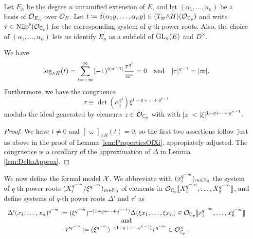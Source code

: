 \documentclass[../main.tex]{subfiles}
\begin{document}
Let $E_n$ be the degree $n$ unramified extension of $E$, and let 
$(\alpha_1, \dots, \alpha_n)$ be a basis of $\mathcal{O}_{E_n}$ over $\mathcal{O}_E$. 
Let $t \coloneq \delta(\alpha_1 y, \dots, \alpha_n y) \in (T_\varpi {\wedge H})(\mathcal{O}_{\mathbb{C}_p})$
and write $\tau \in {\mathrm{Nilp}}^\flat(\mathcal{O}_{\mathbb{C}_p})$ for the corresponding system of $q$-th 
power roots. Also, the choice of $(\alpha_1, \dots, \alpha_n)$ lets us 
identify $E_n$ as a subfield of $\operatorname{GL}_n(E)$ and $D^\times$. 

\begin{lem}\label{lem:PropertiesOfTau}
  We have 
  \begin{equation*}
    \log_{\wedge H}(t) = \sum_{i = -\infty}^\infty (-1)^{i(n-1)} \frac{\tau^{q^i}}{\varpi^i} = 0
    \quad \text{and} \quad
    \lvert \tau \rvert^{q-1} = \lvert \varpi \rvert.
  \end{equation*}
  Furthermore, we have the congruence
  \begin{equation*}
    \tau \equiv \det(\alpha_i^{q^j}) \xi^{1 + q + \dots + q^{n-1}}
  \end{equation*}
  modulo the ideal generated by elements $z \in \mathcal{O}_{\mathbb{C}_p}$ with with 
  $\lvert z \rvert < \lvert \xi \rvert^{1 + q + \dots + q^{n-1}}$. 
\begin{proof}
  We have $t \neq 0$ and $[\varpi]_{\wedge H}(t) = 0$, so the first two
  assertions follow just as above in the proof of Lemma
  \ref{lem:PropertiesOfXi}, appropiately adjusted. The congruence is a
  corollary of the approximation of $\Delta$ in Lemma \ref{lem:DeltaApprox}.
\end{proof}
\end{lem}

We now define the formal model $\mathcal{X}$. We abbreviate with $(x_i^{q^{-m}})_{m \in
\mathbb{N}_0}$ the system of 
$q$-th power roots $(X_i^{q^{-m}}/\xi^{q^{-m}})_{m \in \mathbb{N}_0}$ of elements in
$\mathcal{O}_{\mathbb{C}_p} \llbracket X_1^{q^{-\infty}}, \dots, X_n^{q^{-\infty}}\rrbracket$, and define
systems of $q$-th power roots $\Delta'$ and $\tau'$ as
\begin{equation*}
  \begin{array}c
  \Delta'(x_1, \dots, x_n)^{q^{-m}} \coloneq (\xi^{q^{-m}})^{-(1 + q + \dots +
  q^{n-1})} \Delta(\xi x_1, \dots, \xi x_n) \in \cO_\Cp \llbr x_1^{q^{-\infty}}, \dots
  , x_n^{q^{-\infty}}\rrbr  \\
  \text{and} \\
  \tau'^{q^{-m}} \coloneq (\xi^{q^{-m}})^{-(1 + q + \dots + q^{n-1})} \tau^{q^{-m}} \in
  \cO_\Cp^\times.
  \end{array}
\end{equation*}
\end{document}
